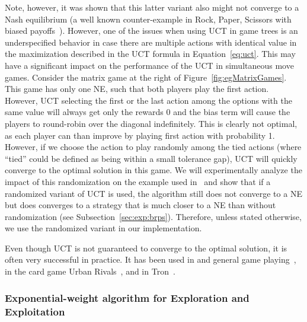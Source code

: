 Note, however, it was shown that this latter variant also might not converge to a Nash equilibrium (a well known counter-example in Rock, Paper, Scissors with biased payoffs~\cite{Shafiei09}). 
However, one of the issues when using UCT in game trees is an underspecified behavior in case there are multiple actions with identical value in the maximization described in the UCT formula in Equation~\ref{eq:uct}.
This may have a significant impact on the performance of the UCT in simultaneous move games. 
Consider the matrix game at the right of Figure~\ref{fig:egMatrixGames}. 
This game has only one NE, such that both players play the first action. However, UCT selecting the first or the last action among the options with the same value will always get only the rewards 0 and the bias term will cause the players to round-robin over the diagonal indefinitely. This is clearly not optimal, as each player can than improve by playing first action with probability 1. However, if we choose the action to play randomly among the tied actions (where ``tied'' could be defined as being within a small tolerance gap), UCT will quickly converge to the optimal solution in this game. 
We will experimentally analyze the impact of this randomization on the example used in~\cite{Shafiei09} and show that if a randomized variant of UCT is used, the algorithm still does not converge to a NE but does converges to a strategy that is much closer to a NE than without randomization (see Subsection~\ref{sec:exp:brps}).
Therefore, unless stated otherwise, we use the randomized variant in our implementation.

Even though UCT is not guaranteed to converge to the optimal solution, it is often very successful in practice.
It has been used in and general game playing~\cite{Finnsson12}, in the card game Urban Rivals~\cite{Teytaud11Upper},
and in Tron~\cite{Perick12Comparison}.


\subsubsection{Exponential-weight algorithm for Exploration and Exploitation}\label{sec:exp3}

